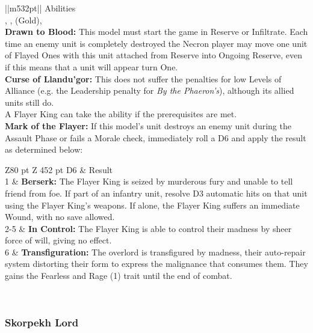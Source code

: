 \noindent
\begin{tabular}{||m{532pt}||}
	\hline
	Abilities \\
	\hline
	, , (Gold),  \\
	\textbf{Drawn to Blood:} This model must start the game in Reserve or Infiltrate. Each time an enemy unit is completely destroyed the Necron player may move one unit of Flayed Ones with this unit attached from Reserve into Ongoing Reserve, even if this means that a unit will appear turn One. \\
	\textbf{Curse of Llandu'gor:} This does not suffer the penalties for low Levels of Alliance (e.g. the Leadership penalty for \textit{By the Phaeron's}), although its allied units still do. \\
	A Flayer King can take the  ability if the prerequisites are met. \\
	\textbf{Mark of the Flayer:} If this model's unit destroys an enemy unit during the Assault Phase or fails a Morale check, immediately roll a D6 and apply the result as determined below: \\
	\begin{tabular}{Z{80 pt} Z {452 pt}}
		D6 & Result \\
		1 & \textbf{Berserk:} The Flayer King is seized by murderous fury and unable to tell friend from foe. If part of an infantry unit, resolve D3 automatic hits on that unit using the Flayer King's weapons. If alone, the Flayer King suffers an immediate Wound, with no save allowed. \\
		2-5 & \textbf{In Control:} The Flayer King is able to control their madness by sheer force of will, giving no effect. \\
		6 & \textbf{Transfiguration:} The overlord is transfigured by madness, their auto-repair system distorting their form to express the malignance that consumes them. They gains the Fearless and Rage (1) trait until the end of combat.\\
	\end{tabular} \\ %
	\hline
\end{tabular}

\newpage
\subsubsection{Skorpekh Lord}

